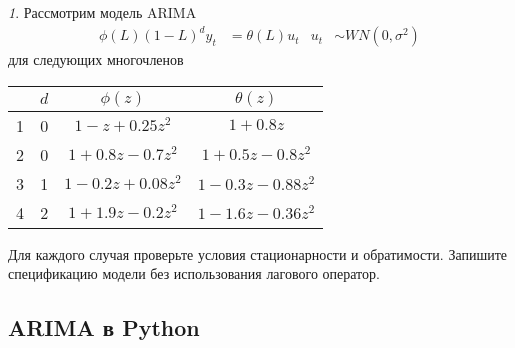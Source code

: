 \documentclass[12pt]{article}
\theoremstyle{remark}
\newtheorem{exercise}{}[subsection]
\begin{document}
\begin{exercise}
Рассмотрим модель ARIMA
\begin{align*}
	\phi(L)(1-L)^dy_t&=\theta(L)u_t & u_t&\sim WN(0,\sigma^2)
\end{align*}
для следующих многочленов
\begin{center}
	\begin{tabular}{l|c|c|c}
		\textnumero & \(d\) & \(\phi(z)\) & \(\theta(z)\) \\ \hline
		1 & 0 & \(1-z+0.25z^2\) & \(1+0.8z\) \\ \hline
		2 & 0 & \(1+0.8z-0.7z^2\) & \(1+0.5z-0.8z^2\) \\ \hline
		3 & 1 & \(1-0.2z+0.08z^2\) & \(1-0.3z-0.88z^2\) \\ \hline
		4 & 2 & \(1+1.9z-0.2z^2\) & \(1-1.6z-0.36z^2\) \\ \hline
	\end{tabular}
\end{center}
Для каждого случая проверьте условия стационарности и обратимости.
Запишите спецификацию модели без использования лагового оператор.
\end{exercise}

\subsection{ARIMA в Python}
\end{document}
